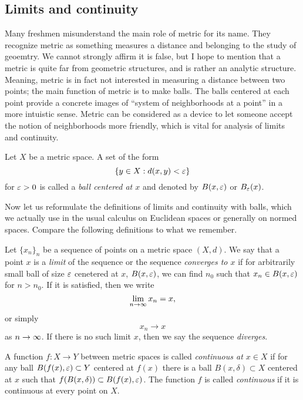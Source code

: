 \documentclass{../crs}
\begin{document}
\subsection{Limits and continuity}

Many freshmen misunderstand the main role of metric for its name.
They recognize metric as something measures a distance and belonging to the study of geoemtry.
We cannot strongly affirm it is false, but I hope to mention that a metric is quite far from geometric structures, and is rather an analytic structure.
Meaning, metric is in fact not interested in measuring a distance between two points; the main function of metric is to make balls.
The balls centered at each point provide a concrete images of ``system of neighborhoods at a point'' in a more intuistic sense.
Metric can be considered as a device to let someone accept the notion of neighborhoods more friendly, which is vital for analysis of limits and continuity.

\begin{defn}
Let $X$ be a metric space.
A set of the form 
\[\{y\in X:d(x,y)<\varepsilon\}\]
for $\varepsilon>0$ is called a \emph{ball centered at $x$} and denoted by $B(x,\varepsilon)$ or $B_\varepsilon(x)$.
\end{defn}

Now let us reformulate the definitions of limits and continuity with balls, which we actually use in the usual calculus on Euclidean spaces or generally on normed spaces.
Compare the following definitions to what we remember.

\begin{defn}
Let $\{x_n\}_n$ be a sequence of points on a metric space $(X,d)$.
We say that a point $x$ is a \emph{limit} of the sequence or the sequence \emph{converges to $x$} if for arbitrarily small ball of size $\varepsilon$ cenetered at $x$, $B(x,\varepsilon)$, we can find $n_0$ such that $x_n\in B(x,\varepsilon)$ for $n>n_0$.
If it is satisfied, then we write
\[\lim_{n\to\oo}x_n=x,\]
or simply
\[x_n\to x\]
as $n\to\oo$.
If there is no such limit $x$, then we say the sequence \emph{diverges}.
\end{defn}
\begin{defn}
A function $f:X\to Y$ between metric spaces is called \emph{continuous at $x\in X$} if for any ball $B(f(x),\varepsilon)\subset Y$ centered at $f(x)$ there is a ball $B(x,\delta)\subset X$ centered at $x$ such that $f(B(x,\delta))\subset B(f(x),\varepsilon)$.
The function $f$ is called \emph{continuous} if it is continuous at every point on $X$.
\end{defn}
\end{document}
